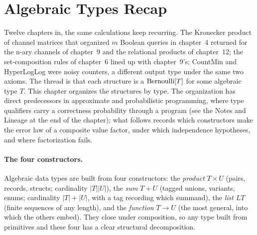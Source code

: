 %

\section{Algebraic Types Recap}
\label{sec:algebraic-types-recap}

Twelve chapters in, the same calculations keep recurring. The Kronecker product
of channel matrices that organized $m$ Boolean queries in chapter~4 returned for
the n-ary channels of chapter~9 and the relational products of chapter~12; the
set-composition rules of chapter~6 lined up with chapter~9's; CountMin and
HyperLogLog were noisy counters, a different output type under the same two
axioms. The thread is that each structure is a $\mathrm{Bernoulli}[T]$ for some algebraic
type $T$. This chapter organizes the structures by type.
The organization has direct predecessors in approximate and probabilistic
programming, where type qualifiers carry a correctness probability through a
program (see the Notes and Lineage at the end of the chapter); what follows records which constructors
make the error law of a composite value factor, under which independence
hypotheses, and where factorization fails.

\paragraph{The four constructors.}
Algebraic data types are built from four constructors: the
\emph{product} $T \times U$ (pairs, records, structs;
cardinality $|T||U|$), the \emph{sum} $T + U$ (tagged unions,
variants, enums; cardinality $|T| + |U|$, with a tag recording which summand),
the \emph{list} $L T$ (finite sequences of any length),
and the \emph{function} $T \to U$ (the most general, into which the
others embed). They close under composition, so any type built from primitives
and these four has a clear structural decomposition.

